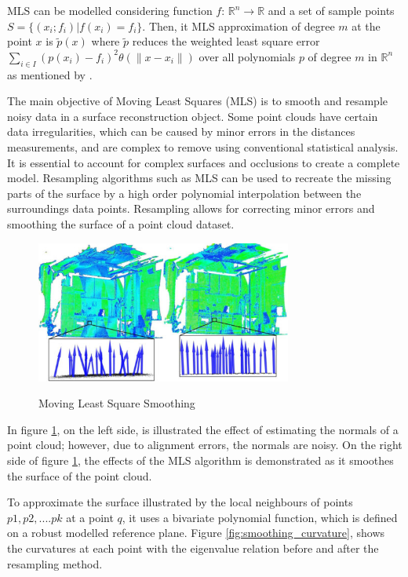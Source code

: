 \documentclass[12pt]{report}
\begin{document}
MLS can be modelled considering function $f$: $\mathbb{R}^n \rightarrow \mathbb{R}$ and a set of sample points $S = \{ ( x_i ; f_i ) | f(x_i) = f_i\} $.
Then, it MLS approximation of degree $m$ at the point $x$ is $\tilde{p} (x)$ where $\tilde{p}$ reduces the weighted least square error
$\sum_{i \in I} (p(x_i)-f_i)^2 \theta (\| x-x_i\| )$ over all polynomials $p$ of degree $m$ in $\mathbb{R}^n$ as mentioned by .

The main objective of Moving Least Squares (MLS) is to smooth and resample noisy data in a surface reconstruction object.
Some point clouds have certain data irregularities, which can be caused by minor errors in the distances measurements, and are complex to remove using conventional
statistical analysis. It is essential to account for complex surfaces and occlusions to create a complete model. Resampling algorithms such as MLS can be used to 
recreate the missing parts of the surface by a high order polynomial interpolation between the surroundings data points.
Resampling allows for correcting minor errors and smoothing the surface of a point cloud dataset. 
\enlargethispage{\baselineskip}

\begin{figure}[H]%
  \centering
  \includegraphics[width=0.75\textwidth]{resampling_1.jpg}
 \caption{Moving Least Square Smoothing}\cite[]{Rusu_ICRA2011_PCL}
 \label{fig:smoothing_mls} 
\end{figure}

In figure \ref{fig:smoothing_mls}, on the left side,  is illustrated the effect of estimating the normals of a point cloud; however, due to alignment errors,
the normals are noisy. On the right side of figure \ref{fig:smoothing_mls}, the effects of the MLS algorithm is demonstrated as it smoothes the surface of the point cloud.

To approximate the surface illustrated by the local neighbours of points $p1,p2,....pk$ at a point $q$, it uses a bivariate polynomial function, which is defined on a robust modelled reference plane.
Figure \ref{fig:smoothing_curvature}, shows the curvatures at each point with the eigenvalue relation before and after the resampling method. 
\end{document}
